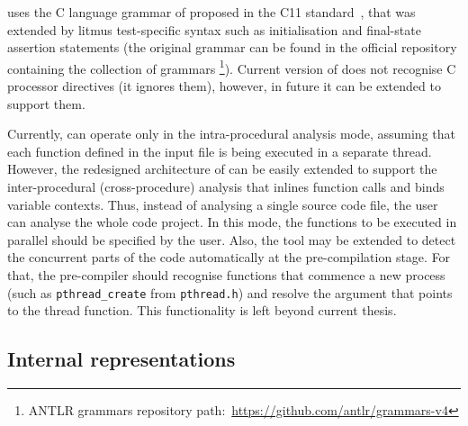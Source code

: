 
\porthos[2] uses the C language grammar of proposed in the C11 standard~\cite{jtc2011sc22}, that was extended by litmus test-specific syntax such as initialisation and final-state assertion statements (the original  grammar can be found in the official repository containing the collection of  grammars%
%
\footnote{ANTLR grammars repository path:~\url{https://github.com/antlr/grammars-v4}}). %
%
Current version of \porthos[2] does not recognise C processor directives (it ignores them), however, in future it can be extended to support them.

Currently, \porthos[2] can operate only in the intra-procedural analysis mode, assuming that each function defined in the input file is being executed in a separate thread.
However, the redesigned architecture of \porthos[2] can be easily extended to support the inter-procedural (cross-procedure) analysis that inlines function calls and binds variable contexts.
Thus, instead of analysing a single source code file, the user can analyse the whole code project.
In this mode, the functions to be executed in parallel should be specified by the user.
Also, the tool may be extended to detect the concurrent parts of the code automatically at the pre-compilation stage.
For that, the pre-compiler should recognise functions that commence a new process (such as \texttt{pthread\_create} from \texttt{pthread.h}) and resolve the argument that points to the thread function.
This functionality %
is left beyond current thesis.



\subsection{Internal representations}
\label{ch:impl:model}

